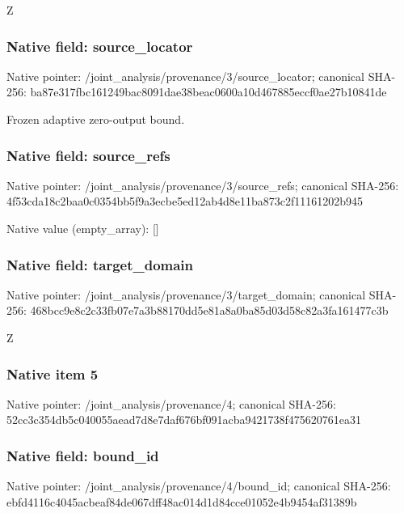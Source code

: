 \documentclass[10pt,a4paper]{article}
\begin{document}
\begingroup\raggedright\sloppy Z\par\endgroup

\subsubsection{Native field: source\_\allowbreak{}locator}
Native pointer: /joint\_\allowbreak{}analysis/provenance/3/source\_\allowbreak{}locator; canonical SHA-256: ba87e317fbc161249bac8091dae38beac0600a10d467885eccf0ae27b10841de

\begingroup\raggedright\sloppy Frozen adaptive zero-output bound.\par\endgroup

\subsubsection{Native field: source\_\allowbreak{}refs}
Native pointer: /joint\_\allowbreak{}analysis/provenance/3/source\_\allowbreak{}refs; canonical SHA-256: 4f53cda18c2baa0c0354bb5f9a3ecbe5ed12ab4d8e11ba873c2f11161202b945

Native value (empty\_\allowbreak{}array): []

\subsubsection{Native field: target\_\allowbreak{}domain}
Native pointer: /joint\_\allowbreak{}analysis/provenance/3/target\_\allowbreak{}domain; canonical SHA-256: 468bcc9e8c2c33fb07e7a3b88170dd5e81a8a0ba85d03d58c82a3fa161477c3b

\begingroup\raggedright\sloppy Z\par\endgroup

\subsubsection{Native item 5}
Native pointer: /joint\_\allowbreak{}analysis/provenance/4; canonical SHA-256: 52cc3c354db5c040055aead7d8e7daf676bf091acba9421738f475620761ea31

\subsubsection{Native field: bound\_\allowbreak{}id}
Native pointer: /joint\_\allowbreak{}analysis/provenance/4/bound\_\allowbreak{}id; canonical SHA-256: ebfd4116c4045acbeaf84de067dff48ac014d1d84cce01052e4b9454af31389b
\end{document}
